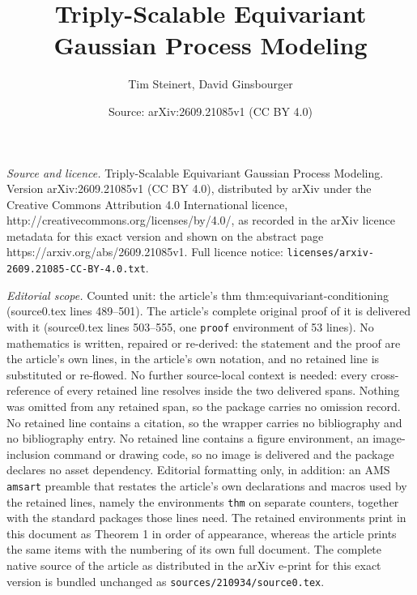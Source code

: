 \documentclass[10pt,a4paper]{amsart}
\title{Triply-Scalable Equivariant Gaussian Process Modeling}
\author{Tim Steinert, David Ginsbourger}
\date{Source: arXiv:2609.21085v1 (CC BY 4.0)}
\begin{document}
\maketitle

\noindent\emph{Source and licence.} Triply-Scalable Equivariant Gaussian Process Modeling. Version arXiv:2609.21085v1 (CC BY 4.0), distributed by arXiv under the Creative Commons Attribution 4.0 International licence, http://creativecommons.org/licenses/by/4.0/, as recorded in the arXiv licence metadata for this exact version and shown on the abstract page https://arxiv.org/abs/2609.21085v1. Full licence notice: \texttt{licenses/arxiv-2609.21085-CC-BY-4.0.txt}.\par\smallskip

\noindent\textit{Editorial scope.} Counted unit: the article's thm thm:equivariant-conditioning (source0.tex lines 489--501). The article's complete original proof of it is delivered with it (source0.tex lines 503--555, one \texttt{proof} environment of 53 lines). No mathematics is written, repaired or re-derived: the statement and the proof are the article's own lines, in the article's own notation, and no retained line is substituted or re-flowed.  No further source-local context is needed: every cross-reference of every retained line resolves inside the two delivered spans.  Nothing was omitted from any retained span, so the package carries no omission record.  No retained line contains a citation, so the wrapper carries no bibliography and no bibliography entry.  No retained line contains a figure environment, an image-inclusion command or drawing code, so no image is delivered and the package declares no asset dependency.  Editorial formatting only, in addition: an AMS \texttt{amsart} preamble that restates the article's own declarations and macros used by the retained lines, namely the environments \texttt{thm} on separate counters, together with the standard packages those lines need.  The retained environments print in this document as Theorem 1 in order of appearance, whereas the article prints the same items with the numbering of its own full document.  The complete native source of the article as distributed in the arXiv e-print for this exact version is bundled unchanged as \texttt{sources/210934/source0.tex}.
\end{document}
